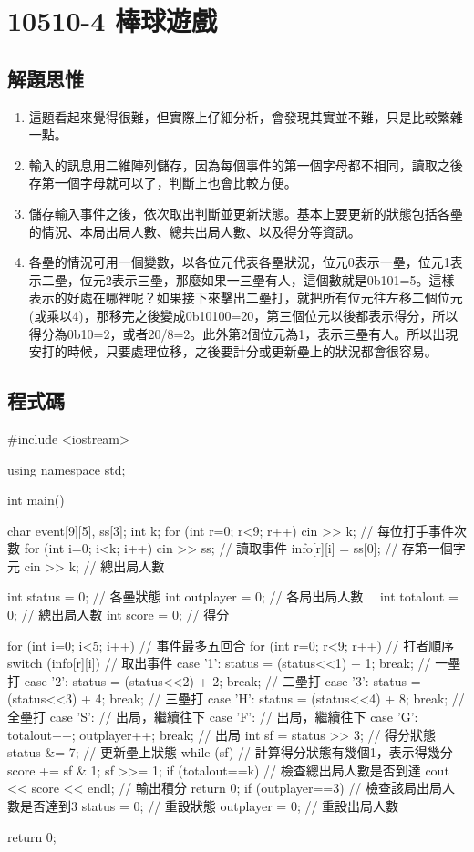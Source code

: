 \section{10510-4 棒球遊戲}

\subsection{解題思惟}
\begin{enumerate}
	\item 這題看起來覺得很難，但實際上仔細分析，會發現其實並不難，只是比較繁雜一點。
	\item 輸入的訊息用二維陣列儲存，因為每個事件的第一個字母都不相同，讀取之後存第一個字母就可以了，判斷上也會比較方便。
	\item 儲存輸入事件之後，依次取出判斷並更新狀態。基本上要更新的狀態包括各壘的情況、本局出局人數、總共出局人數、以及得分等資訊。
	\item 各壘的情況可用一個變數，以各位元代表各壘狀況，位元0表示一壘，位元1表示二壘，位元2表示三壘，那麼如果一三壘有人，這個數就是0b101=5。這樣表示的好處在哪裡呢？如果接下來擊出二壘打，就把所有位元往左移二個位元(或乘以4)，那移完之後變成0b10100=20，第三個位元以後都表示得分，所以得分為0b10=2，或者20/8=2。此外第2個位元為1，表示三壘有人。所以出現安打的時候，只要處理位移，之後要計分或更新壘上的狀況都會很容易。
\end{enumerate}

\subsection{程式碼}
\begin{cppcode}
#include <iostream>

using namespace std;

int main()
{
	char event[9][5], ss[3];
	int k;
	for (int r=0; r<9; r++) {
		cin >> k; // 每位打手事件次數
		for (int i=0; i<k; i++) {
			cin >> ss; // 讀取事件
			info[r][i] = ss[0]; // 存第一個字元
		}
	}
	cin >> k; // 總出局人數
	
	int status = 0; // 各壘狀態
	int outplayer = 0; // 各局出局人數　
	int totalout = 0; // 總出局人數
	int score = 0; // 得分
	
	for (int i=0; i<5; i++) { // 事件最多五回合
		for (int r=0; r<9; r++) { // 打者順序
			switch (info[r][i]) { // 取出事件
				case '1': status = (status<<1) + 1; break; // 一壘打
				case '2': status = (status<<2) + 2; break; // 二壘打
				case '3': status = (status<<3) + 4; break; // 三壘打
				case 'H': status = (status<<4) + 8; break; // 全壘打
				case 'S': // 出局，繼續往下
				case 'F': // 出局，繼續往下
				case 'G': totalout++; outplayer++; break; // 出局
			}
			int sf = status >> 3; // 得分狀態
			status &= 7; // 更新壘上狀態
			while (sf) { // 計算得分狀態有幾個1，表示得幾分
				score += sf & 1;
				sf >>= 1;
			}
			if (totalout==k) { // 檢查總出局人數是否到達
				cout << score << endl; // 輸出積分
				return 0;
			}
			if (outplayer==3) { // 檢查該局出局人數是否達到3
				status = 0; // 重設狀態
				outplayer = 0; // 重設出局人數
			}
		}
	}
	
	return 0;
}
\end{cppcode}
